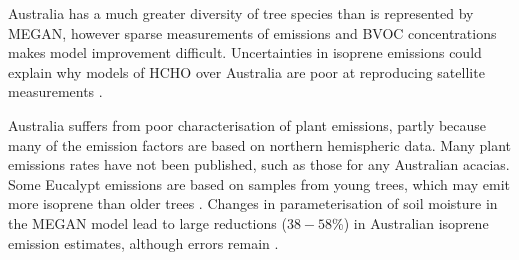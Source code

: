     
    Australia has a much greater diversity of tree species than is represented by MEGAN, however sparse measurements of emissions and BVOC concentrations makes model improvement difficult.
    Uncertainties in isoprene emissions could explain why models of HCHO over Australia are poor at reproducing satellite measurements \parencite{Stavrakou2009}.
    
    
    Australia suffers from poor characterisation of plant emissions, partly because many of the emission factors are based on northern hemispheric data.
    Many plant emissions rates have not been published, such as those for any Australian acacias.
    Some Eucalypt emissions are based on samples from young trees, which may emit more isoprene than older trees \parencite{Emmerson2016}.
    Changes in parameterisation of soil moisture in the MEGAN model lead to large reductions ($38-58$\%) in Australian isoprene emission estimates, although errors remain \parencite{Sindelarova2014, Emmerson2019}.
    
